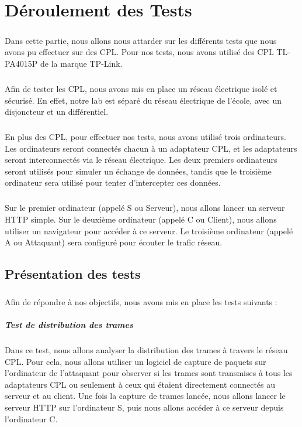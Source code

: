 \documentclass[a4paper,twocolumn]{report}
\begin{document}
\chapter{Déroulement des Tests}
\paragraph{}Dans cette partie, nous allons nous attarder sur les différents tests
que nous avons pu effectuer sur des CPL. Pour nos tests, nous avons utilisé des CPL TL-PA4015P de la marque TP-Link.
\paragraph{}Afin de tester les CPL, nous avons mis en place un réseau électrique
isolé et sécurisé. En effet, notre lab est séparé du réseau électrique de l'école,
avec un disjoncteur et un différentiel.
\paragraph{}En plus des CPL, pour effectuer nos tests, nous avons utilisé trois ordinateurs.
Les ordinateurs seront connectés chacun à un adaptateur CPL, et les adaptateurs 
seront interconnectés via le réseau électrique. Les deux premiers ordinateurs seront utilisés
pour simuler un échange de données, tandis que le troisième ordinateur sera utilisé pour tenter
d'intercepter ces données.
\paragraph{}Sur le premier ordinateur (appelé S ou Serveur), nous allons lancer un serveur HTTP simple.
Sur le deuxième ordinateur (appelé C ou Client), nous allons utiliser un navigateur pour accéder à ce serveur.
Le troisième ordinateur (appelé A ou Attaquant) sera configuré pour écouter le trafic réseau.


\section{Présentation des tests}
\paragraph{}Afin de répondre à nos objectifs, nous avons mis en place les tests suivants :
\paragraph{Test de distribution des trames} Dans ce test, nous allons analyser la distribution
des trames à travers le réseau CPL. Pour cela, nous allons utiliser un logiciel de capture
de paquets sur l'ordinateur de l'attaquant pour observer si les trames sont transmises à tous
les adaptateurs CPL ou seulement à ceux qui étaient directement connectés au serveur et au client.
Une fois la capture de trames lancée, nous allons lancer le serveur HTTP sur l'ordinateur S,
puis nous allons accéder à ce serveur depuis l'ordinateur C. 
\end{document}
